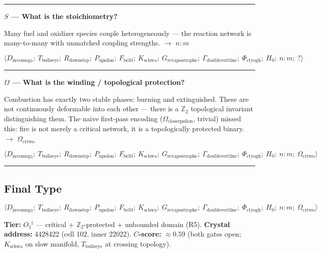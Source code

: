 \documentclass[12pt,a4paper]{article}
\begin{document}
\begin{center}
\rule{0.5\textwidth}{0.4pt}
\end{center}

\textbf{$S$ --- What is the stoichiometry?}

Many fuel and oxidizer species couple heterogeneously --- the reaction network is many-to-many with unmatched coupling strengths. $\rightarrow$ $n{:}m$

\[\langle D_{\text{invomega}};\ T_{\text{bullseye}};\ R_{\text{downstep}};\ P_{\text{upsilon}};\ F_{\text{beltl}};\ K_{\text{schwa}};\ G_{\text{revapostrophe}};\ \Gamma_{\text{doublevertline}};\ \Phi_{\text{ctyogh}};\ H_0;\ n{:}m;\ ? \rangle\]

\begin{center}
\rule{0.5\textwidth}{0.4pt}
\end{center}

\textbf{$\Omega$ --- What is the winding / topological protection?}

Combustion has exactly two stable phases: burning and extinguished. These are not continuously deformable into each other --- there is a $\mathbb{Z}_2$ topological invariant distinguishing them. The naive first-pass encoding ($\Omega_{\text{closeepsilon}}$, trivial) missed this: fire is not merely a critical network, it is a topologically protected binary. $\rightarrow$ $\Omega_{\text{crtwo}}$

\[\langle D_{\text{invomega}};\ T_{\text{bullseye}};\ R_{\text{downstep}};\ P_{\text{upsilon}};\ F_{\text{beltl}};\ K_{\text{schwa}};\ G_{\text{revapostrophe}};\ \Gamma_{\text{doublevertline}};\ \Phi_{\text{ctyogh}};\ H_0;\ n{:}m;\ \Omega_{\text{crtwo}} \rangle\]

\begin{center}
\rule{0.5\textwidth}{0.4pt}
\end{center}

\subsection{Final Type}

\[\langle D_{\text{invomega}};\ T_{\text{bullseye}};\ R_{\text{downstep}};\ P_{\text{upsilon}};\ F_{\text{beltl}};\ K_{\text{schwa}};\ G_{\text{revapostrophe}};\ \Gamma_{\text{doublevertline}};\ \Phi_{\text{ctyogh}};\ H_0;\ n{:}m;\ \Omega_{\text{crtwo}} \rangle\]

\textbf{Tier:} $O₂^\dagger$ --- critical + $\mathbb{Z}_2$-protected + unbounded domain (R5).
\textbf{Crystal address:} 4428422 (cell 102, inner 22022).
\textbf{$C$-score:} $\approx 0.59$ (both gates open; $K_{\text{schwa}}$ on slow manifold, $T_{\text{bullseye}}$ at crossing topology).
\end{document}
